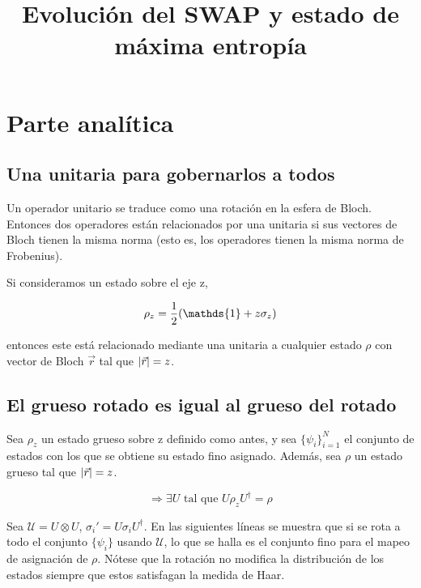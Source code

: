 \documentclass[onecolumn,11pt]{article}
\title{Evolución del SWAP y estado de máxima entropía}
\newcommand{\mcU}{\mathcal{U}}
\newcommand{\Id}{\mathds{1}}%
\begin{document}
\maketitle
\thispagestyle{empty}
\section{Parte analítica}
\subsection{Una unitaria para gobernarlos a todos}

Un operador unitario se traduce como una rotación en la esfera de Bloch. Entonces dos operadores están relacionados por una unitaria si sus vectores de Bloch tienen la misma norma (esto es, los operadores tienen la misma norma de Frobenius).

Si consideramos un estado sobre el eje z,

\begin{equation}
\rho_{z}=\frac{1}{2}\qty(\Id+z\sigma_{z})
\end{equation}

entonces este está relacionado mediante una unitaria a cualquier estado $\rho$ con vector de Bloch $\vec{r}$ tal que $\abs{\vec{r}}=z$.

\subsection{El grueso rotado es igual al grueso del rotado}
Sea $\rho_{z}$ un estado grueso sobre z definido como antes, y sea $\{\psi_{i}\}_{i=1}^{N}$ el conjunto de estados con los que se obtiene su estado fino asignado. Además, sea $\rho$ un estado grueso tal que $\abs{\vec{r}}=z$.

\begin{equation}
\Rightarrow \exists U \text{ tal que } U\rho_{z}U^{\dag}=\rho
\end{equation}

Sea $\mcU=U\otimes U$, $\sigma_{i}'=U\sigma_{i}U^{\dag}$. En las siguientes líneas se muestra que si se rota a todo el conjunto $\{\psi_{i}\}$ usando $\mcU$, lo que se halla es el conjunto fino para el mapeo de asignación de $\rho$. Nótese que la rotación no modifica la distribución de los estados siempre que estos satisfagan la medida de Haar.
\end{document}
